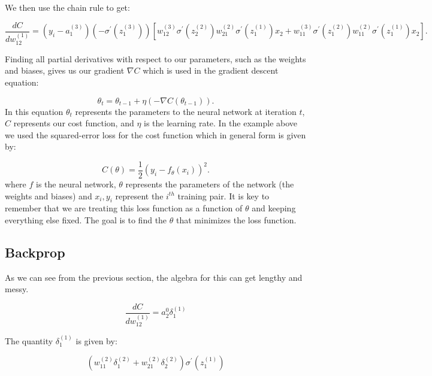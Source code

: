 We then use the chain rule to get:

\begin{equation}
\frac{dC}{dw^{(1)}_{12}} = (y_i - a_1^{(3)})(-\sigma^\prime(z_1^{(3)}))[w_{12}^{(3)}\sigma^\prime(z_2^{(2)})w_{21}^{(2)}\sigma^{\prime}(z_1^{(1)})x_2 + w_{11}^{(3)}\sigma^{\prime}(z_1^{(2)})w_{11}^{(2)}\sigma^{\prime}(z_1^{(1)})x_2].
\end{equation}

Finding all partial derivatives with respect to our parameters, such as the weights and biases, gives us our gradient $\nabla C$ which is used in the gradient descent equation:

\begin{equation}
\theta_t = \theta_{t-1} + \eta \left( -\nabla C(\theta_{t-1}) \right).
\end{equation}
In this equation $\theta_t$ represents the parameters to the neural network at iteration $t$, $C$ represents our cost function, and $\eta$ is the learning rate. In the example above we used the squared-error loss for the cost function which in general form is given by:

\begin{equation}
C(\theta) = \frac{1}{2}(y_i - f_\theta(x_i))^2.
\end{equation}
\noindent where $f$ is the neural network, $\theta$ represents the parameters of the network (the weights and biases) and $x_i, y_i$ represent the $i^{th}$ training pair. It is key to remember that we are treating this loss function as a function of $\theta$ and keeping everything else fixed. The goal is to find the $\theta$ that minimizes the loss function.





\subsection{Backprop}
As we can see from the previous section, the algebra for this can get lengthy and messy. 

\begin{equation}
\frac{dC}{dw^{(1)}_{12}} = a_{2}^{0}\delta_1^{(1)}
\end{equation}

The quantity $\delta_1^{(1)}$ is given by:

\begin{equation}
(w_{11}^{(2)}\delta^{(2)}_1 + w_{21}^{(2)}\delta^{(2)}_2)\sigma^{\prime}(z_1^{(1)})
\end{equation}
 
